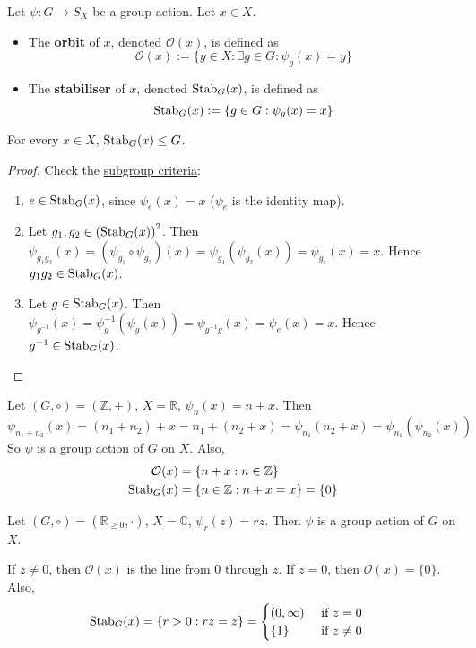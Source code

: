\begin{definition}
	Let $\psi: G \to S_X$ be a group action. Let $x \in X$.
	\begin{itemize}
		\item The \textbf{orbit} of $x$, denoted $\mathcal{O}(x)$, is defined as
		\[
			\mathcal{O}(x) := \{ y \in X: \exists g \in G: \psi_g(x) = y \}
		\]
		\item The \textbf{stabiliser} of $x$, denoted $\text{Stab}_G(x)$, is defined as
		\[
			\text{Stab}_G(x) := \{ g \in G: \psi_g(x) = x \}
		\]
	\end{itemize}
\end{definition}

\begin{lemma}
	For every $x \in X$, $\text{Stab}_G(x) \le G$.
\end{lemma}

\begin{proof}
	Check the \hyperref[prop:subgroupCriteria]{subgroup criteria}:
	\begin{enumerate}
		\item $e \in \text{Stab}_G(x)$, since $\psi_e(x) = x$ ($\psi_e$ is the identity map).
		\item Let $g_1, g_2 \in {(\text{Stab}_G(x))}^2$. Then $\psi_{g_1 g_2}(x) = (\psi_{g_1} \circ \psi_{g_2}) (x) = \psi_{g_1}(\psi_{g_2}(x)) = \psi_{g_1}(x) = x$. Hence $g_1 g_2 \in \text{Stab}_G(x)$.
		\item Let $g \in \text{Stab}_G(x)$. Then $\psi_{g^{-1}}(x) = \psi_{g}^{-1}(\psi_g(x)) = \psi_{g^{-1} g} (x) = \psi_e(x) = x$. Hence $g^{-1} \in \text{Stab}_G(x)$.
	\end{enumerate}
\end{proof}

\begin{example}
	Let $(G, \circ) = (\mathbb{Z}, +)$, $X = \mathbb{R}$, $\psi_n(x) = n + x$. Then
	\[
		\psi_{n_1 + n_2}(x) = (n_1 + n_2) + x = n_1 + (n_2 + x) = \psi_{n_1} (n_2 + x) = \psi_{n_1} (\psi_{n_2} (x))
	\]
	So $\psi$ is a group action of $G$ on $X$. Also,
	\[
		\begin{aligned}
			\mathcal{O}(x) & = \{ n + x: n \in \mathbb{Z} \} \\
			\text{Stab}_G(x) & = \{ n \in \mathbb{Z}: n + x = x \} = \{ 0 \}
		\end{aligned}
	\]
\end{example}

\begin{example}
	Let $(G, \circ) = (\mathbb{R}_{\ge 0}, \cdot)$, $X = \mathbb{C}$, $\psi_r(z) = r z$. Then $\psi$ is a group action of $G$ on $X$.
	
	If $z \ne 0$, then $\mathcal{O}(x)$ is the line from $0$ through $z$. If $z = 0$, then $\mathcal{O}(x) = \{ 0 \}$. Also,
	\[
		\begin{aligned}
			\text{Stab}_G(x) & = \{ r > 0: rz = z \} = \begin{cases}
				(0, \infty) & \text{ if } z = 0 \\
				\{ 1 \} & \text{ if } z \ne 0
			\end{cases}
		\end{aligned}
	\]
\end{example}

